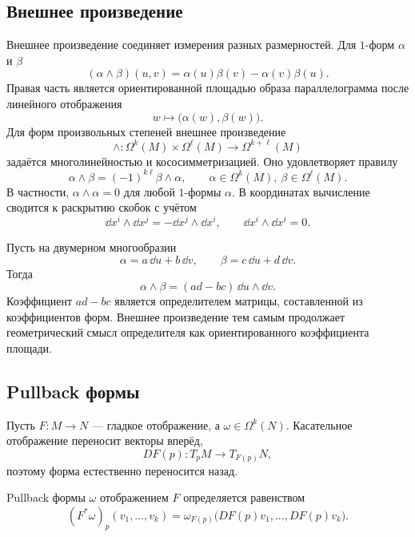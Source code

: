 \subsection{Внешнее произведение}

Внешнее произведение соединяет измерения разных размерностей. Для \(1\)-форм \(\alpha\) и \(\beta\)
\begin{equation}
\label{eq:wedge-two-one-forms-manifold}
(\alpha\wedge\beta)(u,v)
=
\alpha(u)\beta(v)-\alpha(v)\beta(u).
\end{equation}
Правая часть является ориентированной площадью образа параллелограмма после линейного отображения
\[
w\longmapsto \bigl(\alpha(w),\beta(w)\bigr).
\]
Для форм произвольных степеней внешнее произведение
\[
\wedge:\Omega^k(M)\times\Omega^\ell(M)\to\Omega^{k+\ell}(M)
\]
задаётся многолинейностью и кососимметризацией. Оно удовлетворяет правилу
\begin{equation}
\label{eq:wedge-graded-commutativity}
\alpha\wedge\beta
=(-1)^{k\ell}\beta\wedge\alpha,
\qquad
\alpha\in\Omega^k(M),\ \beta\in\Omega^\ell(M).
\end{equation}
В частности, \(\alpha\wedge\alpha=0\) для любой \(1\)-формы \(\alpha\). В координатах вычисление сводится к раскрытию скобок с учётом
\[
\dd x^i\wedge\dd x^j=-\dd x^j\wedge\dd x^i,
\qquad
\dd x^i\wedge\dd x^i=0.
\]

\begin{example}
Пусть на двумерном многообразии
\[
\alpha=a\,\dd u+b\,\dd v,
\qquad
\beta=c\,\dd u+d\,\dd v.
\]
Тогда
\begin{equation}
\label{eq:wedge-two-one-forms-determinant}
\alpha\wedge\beta
=(ad-bc)\,\dd u\wedge\dd v.
\end{equation}
Коэффициент \(ad-bc\) является определителем матрицы, составленной из коэффициентов форм. Внешнее произведение тем самым продолжает геометрический смысл определителя как ориентированного коэффициента площади.
\end{example}

\subsection{Pullback формы}

Пусть \(F:M\to N\) --- гладкое отображение, а \(\omega\in\Omega^k(N)\). Касательное отображение переносит векторы вперёд,
\[
DF(p):T_pM\to T_{F(p)}N,
\]
поэтому форма естественно переносится назад.

\begin{definition}
Pullback формы \(\omega\) отображением \(F\) определяется равенством
\begin{equation}
\label{eq:k-form-pullback-definition}
(F^*\omega)_p(v_1,\ldots,v_k)
=
\omega_{F(p)}\bigl(DF(p)v_1,\ldots,DF(p)v_k\bigr).
\end{equation}
\end{definition}

